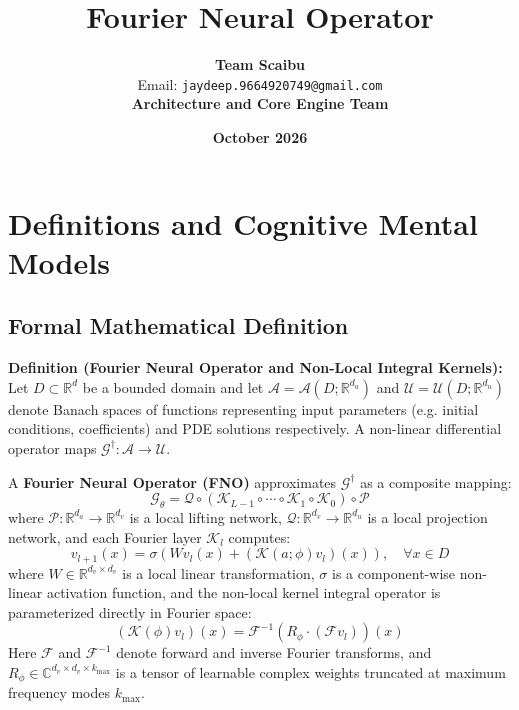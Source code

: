 \documentclass[11pt,a4paper]{article}
\title{\textbf{Fourier Neural Operator}}
\author{\textbf{Team Scaibu} \\ \small Email: \texttt{jaydeep.9664920749@gmail.com} \\ \small \textbf{Architecture and Core Engine Team}}
\date{\textbf{October 2026}}
\theoremstyle{definition}
\begin{document}
\maketitle

\section{Definitions and Cognitive Mental Models}

\subsection{Formal Mathematical Definition}
\textbf{Definition (Fourier Neural Operator and Non-Local Integral Kernels):}
Let $D \subset \mathbb{R}^d$ be a bounded domain and let $\mathcal{A} = \mathcal{A}(D; \mathbb{R}^{d_a})$ and $\mathcal{U} = \mathcal{U}(D; \mathbb{R}^{d_u})$ denote Banach spaces of functions representing input parameters (e.g. initial conditions, coefficients) and PDE solutions respectively. A non-linear differential operator maps $\mathcal{G}^\dagger: \mathcal{A} \to \mathcal{U}$.

A \textbf{Fourier Neural Operator (FNO)} approximates $\mathcal{G}^\dagger$ as a composite mapping:
{\boldmath
\begin{equation}
\mathcal{G}_\theta = \mathcal{Q} \circ (\mathcal{K}_{L-1} \circ \cdots \circ \mathcal{K}_1 \circ \mathcal{K}_0) \circ \mathcal{P}
\end{equation}
}
where $\mathcal{P}: \mathbb{R}^{d_a} \to \mathbb{R}^{d_v}$ is a local lifting network, $\mathcal{Q}: \mathbb{R}^{d_v} \to \mathbb{R}^{d_u}$ is a local projection network, and each Fourier layer $\mathcal{K}_l$ computes:
{\boldmath
\begin{equation}
v_{l+1}(x) = \sigma \left( W v_l(x) + (\mathcal{K}(a; \phi) v_l)(x) \right), \quad \forall x \in D
\end{equation}
}
where $W \in \mathbb{R}^{d_v \times d_v}$ is a local linear transformation, $\sigma$ is a component-wise non-linear activation function, and the non-local kernel integral operator is parameterized directly in Fourier space:
{\boldmath
\begin{equation}
(\mathcal{K}(\phi) v_l)(x) = \mathcal{F}^{-1} \left( R_\phi \cdot (\mathcal{F} v_l) \right)(x)
\end{equation}
}
Here $\mathcal{F}$ and $\mathcal{F}^{-1}$ denote forward and inverse Fourier transforms, and $R_\phi \in \mathbb{C}^{d_v \times d_v \times k_{\max}}$ is a tensor of learnable complex weights truncated at maximum frequency modes $k_{\max}$.
\end{document}
